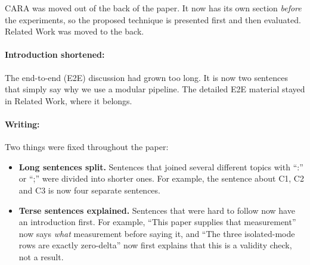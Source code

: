 \documentclass[11pt,a4paper]{article}
\begin{document}
CARA was moved out of the back of the paper. It now has its own section
\emph{before} the experiments, so the proposed technique is presented first and
then evaluated. Related Work was moved to the back.

\paragraph{Introduction shortened:} The end-to-end (E2E) discussion had grown too
long. It is now two sentences that simply say why we use a modular pipeline. The
detailed E2E material stayed in Related Work, where it belongs.

\paragraph{Writing:} Two things were fixed throughout the paper:

\begin{itemize}[noitemsep]
    \item \textbf{Long sentences split.} Sentences that joined several different
          topics with ``:'' or ``;'' were divided into shorter ones. For example,
          the sentence about C1, C2 and C3 is now four separate sentences.
    \item \textbf{Terse sentences explained.} Sentences that were hard to follow
          now have an introduction first. For example, ``This paper supplies that
          measurement'' now says \emph{what} measurement before saying it, and
          ``The three isolated-mode rows are exactly zero-delta'' now first
          explains that this is a validity check, not a result.
\end{itemize}
\end{document}

